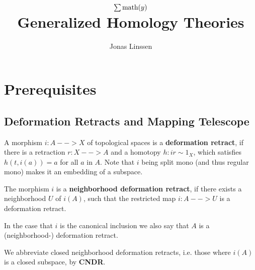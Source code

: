 

\title{$\sum\text{math}(y)$\\Generalized Homology Theories}
\author{Jonas Linssen}


	\maketitle
	\tableofcontents

	\newpage
	\setcounter{section}{-1}
	\section{Prerequisites}
	\subsection{Deformation Retracts and Mapping Telescope}

	\begin{definition}
		A morphism $i:A --> X$ of topological spaces is a \textbf{deformation retract}, if there is a retraction $r:X --> A$ and a homotopy $h:ir \sim 1_X$, which satisfies $h(t,i(a)) = a$ for all $a$ in $A$. Note that $i$ being split mono (and thus regular mono) makes it an embedding of a subspace.

		The morphism $i$ is a \textbf{neighborhood deformation retract}, if there exists a neighborhood $U$ of $i(A)$, such that the restricted map $i:A-->U$ is a deformation retract.

		In the case that $i$ is the canonical inclusion we also say that $A$ is a (neighborhood-) deformation retract.

		We abbreviate closed neighborhood deformation retracts, i.e. those where $i(A)$ is a closed subspace, by \textbf{CNDR}.
	\end{definition}

